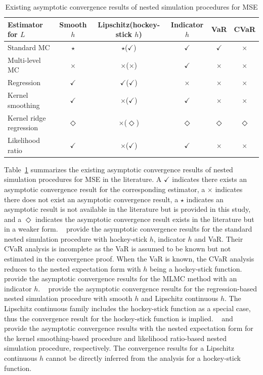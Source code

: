 \begin{table}[ht]
    \centering
    \footnotesize
    \begin{tabular}{|l|c|c|c|c|c|}
    \hline
    \textbf{Estimator for} $L$ & \textbf{Smooth} $h$ & \textbf{Lipschitz}(\textbf{hockey-stick} $h$) & \textbf{Indicator} $h$ & \textbf{VaR} & \textbf{CVaR} \\
    \hline
    Standard MC & $\star$ & $\star$($\checkmark$) & $\checkmark$ & $\checkmark$ & $\times$ \\
    \hline
    Multi-level MC & $\times$ & $\times$($\times$) & $\checkmark$ & $\times$ & $\times$ \\
    \hline
    Regression & $\checkmark$ & $\checkmark$($\checkmark$) & $\times$ & $\times$ & $\times$ \\
    \hline
    Kernel smoothing & $\checkmark$ & $\times$($\checkmark$) & $\checkmark$ & $\times$ & $\times$ \\
    \hline
    Kernel ridge regression & $\Diamond$ & $\times$($\Diamond$) & $\Diamond$ & $\Diamond$ & $\Diamond$ \\
    \hline
    Likelihood ratio & $\checkmark$ & $\times$($\checkmark$) & $\checkmark$ & $\times$ & $\times$ \\
    \hline
    \end{tabular}
    \caption{Existing asymptotic convergence results of nested simulation procedures for MSE}
    \label{tab1:asymConv-mse}
\end{table}


Table~\ref{tab1:asymConv-mse} summarizes the existing asymptotic convergence results of nested simulation procedures for MSE in the literature.
A $\checkmark$ indicates there exists an asymptotic convergence result for the corresponding estimator,
a $\times$ indicates there does not exist an asymptotic convergence result, 
a $\star$ indicates an asymptotic result is not available in the literature but is provided in this study, and
a $\Diamond$ indicates the asymptotic convergence result exists in the literature but in a weaker form.
~\cite{gordy2010nested} provide the asymptotic convergence results for the standard nested simulation procedure with hockey-stick $h$, indicator $h$ and VaR.
Their CVaR analysis is incomplete as the VaR is assumed to be known but not estimated in the convergence proof.
When the VaR is known, the CVaR analysis reduces to the nested expectation form with $h$ being a hockey-stick function.
~\cite{giles2019multilevel} provide the asymptotic convergence results for the MLMC method with an indicator $h$.
~\cite{broadie2015risk} provide the asymptotic convergence results for the regression-based nested simulation procedure with smooth $h$ and Lipschitz continuous $h$.
The Lipschitz continuous family includes the hockey-stick function as a special case, thus the convergence result for the hockey-stick function is implied.
~\cite{hong2017kernel} and~\cite{zhang2022sample} provide the asymptotic convergence results with the nested expectation form for the kernel smoothing-based procedure and likelihood ratio-based nested simulation procedure, respectively.
The convergence results for a Lipschitz continuous $h$ cannot be directly inferred from the analysis for a hockey-stick function.

